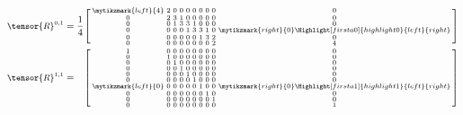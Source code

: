 %
%
\begin{minipage}[c]{0.485\textwidth}%
	\vspace*{0.7cm}%
\begin{align*}%
\text{\small $\tensor{R}^{0,1}$} &= \frac{1}{4} && \hspace{-0.4cm}\left[\begin{smallmatrix} %
\mytikzmark{left}{4} & 2 & 0 & 0 & 0 & 0 & 0 & 0 & 0 & 0\\ 
0 & 2 & 3 & 1 & 0 & 0 & 0 & 0 & 0 & 0\\ 
0 & 0 & 1 & 3 & 3 & 1 & 0 & 0 & 0 & 0\\ 
0 & 0 & 0 & 0 & 1 & 3 & 3 & 1 & 0 & \mytikzmark{right}{0} \Highlight[firsta0]{highlight0}{left}{right}\\ 
0 & 0 & 0 & 0 & 0 & 0 & 1 & 3 & 2 & 0\\ 
0 & 0 & 0 & 0 & 0 & 0 & 0 & 0 & 2 & 4\\ 
\end{smallmatrix} \right]\\
\text{\small $\tensor{R}^{1,1}$} &= && \hspace{-0.4cm}\left[\begin{smallmatrix} %
1 & 0 & 0 & 0 & 0 & 0 & 0 & 0 & 0 & 0\\ 
0 & 1 & 0 & 0 & 0 & 0 & 0 & 0 & 0 & 0\\ 
0 & 0 & 1 & 0 & 0 & 0 & 0 & 0 & 0 & 0\\ 
0 & 0 & 0 & 1 & 0 & 0 & 0 & 0 & 0 & 0\\ 
0  & 0 & 0 & 0 & 1 & 0 & 0 & 0 & 0 & 0\\ 
0 & 0 & 0 & 0 & 0 & 1 & 0 & 0 & 0 & 0\\ 
\mytikzmark{left}{0} & 0 & 0 & 0 & 0 & 0 & 1 & 0 & 0 & \mytikzmark{right}{0} \Highlight[firsta1]{highlight1}{left}{right}\\ 
0 & 0 & 0 & 0 & 0 & 0 & 0 & 1 & 0 & 0\\ 
0 & 0 & 0 & 0 & 0 & 0 & 0 & 0 & 1 & 0\\ 
0 & 0 & 0 & 0 & 0 & 0 & 0 & 0 & 0 & 1
\end{smallmatrix}\right]
\end{align*}%
\end{minipage}%
